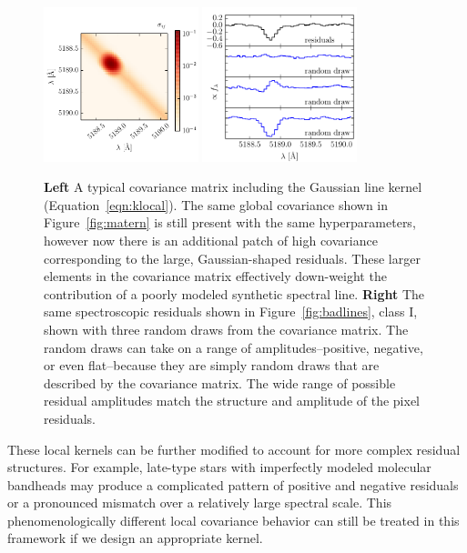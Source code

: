 \documentclass[iop,floatfix]{emulateapj}
\begin{document}
\begin{figure}[!t]
\begin{center}
\includegraphics[width=0.4\textwidth]{figs/gauss_matrix.pdf}
\includegraphics[width=0.4\textwidth]{figs/gauss_draw.pdf}
\caption{\textbf{Left} A typical covariance matrix including the Gaussian line kernel (Equation~\ref{eqn:klocal}). The same global covariance shown in Figure~\ref{fig:matern} is still present with the same hyperparameters, however now there is an additional patch of high covariance corresponding to the large, Gaussian-shaped residuals. These larger elements in the covariance matrix effectively down-weight the contribution of a poorly modeled synthetic spectral line.
\textbf{Right} The same spectroscopic residuals shown in Figure~\ref{fig:badlines}, class I, shown with three random draws from the covariance matrix. The random draws can take on a range of amplitudes--positive, negative, or even flat--because they are simply random draws that are described by the covariance matrix. The wide range of possible residual amplitudes match the structure and amplitude of the pixel residuals.}
\label{fig:region}
\end{center}
\end{figure}

These local kernels can be further modified to account for more complex residual structures.  For 
example, late-type stars with imperfectly modeled molecular bandheads may produce a complicated 
pattern of positive and negative residuals or a pronounced mismatch over a relatively large 
spectral scale.  This phenomenologically different local covariance behavior can still be treated 
in this framework if we design an appropriate kernel. 
\end{document}
